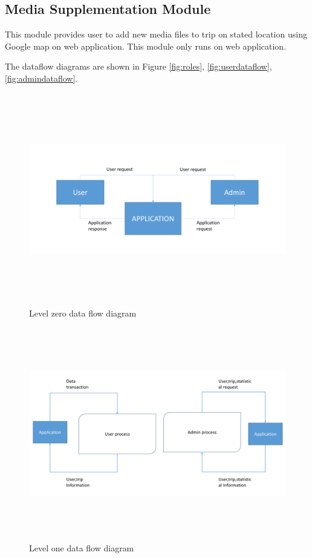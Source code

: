 \subsection{Media Supplementation Module}
This module provides user to add new media files to trip on stated location using Google map on web application. This module only runs on web application.


The dataflow diagrams are shown in Figure \ref{fig:roles}, \ref{fig:userdataflow}, \ref{fig:admindataflow}.


\begin{figure}[!htbp]
\centering
\includegraphics[width=\textwidth, height= 25em]{projectChapters/images/dataflow.png}
\caption{Level zero data flow diagram}
\label{fig:dataflow}
\end{figure}

\begin{figure}[!htbp]
\centering
\includegraphics[width=\textwidth, height= 25em]{projectChapters/images/dataflow2.png}
\caption{Level one data flow diagram}
\label{fig:dataflow2}
\end{figure}

